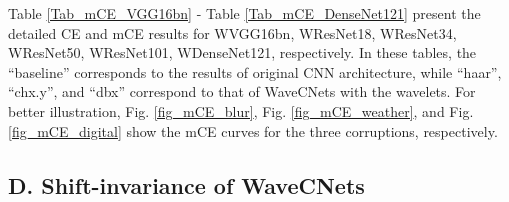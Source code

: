 Table \ref{Tab_mCE_VGG16bn} - Table \ref{Tab_mCE_DenseNet121} present the detailed CE and mCE results for
WVGG16bn, WResNet18, WResNet34, WResNet50, WResNet101, WDenseNet121, respectively.
In these tables, the ``baseline'' corresponds to the results of original CNN architecture,
while ``haar'', ``chx.y'', and ``dbx'' correspond to that of WaveCNets with the wavelets.
For better illustration, Fig. \ref{fig_mCE_blur}, Fig. \ref{fig_mCE_weather}, and Fig. \ref{fig_mCE_digital}
show the mCE curves for the three corruptions, respectively.

\subsection*{D. Shift-invariance of WaveCNets}

